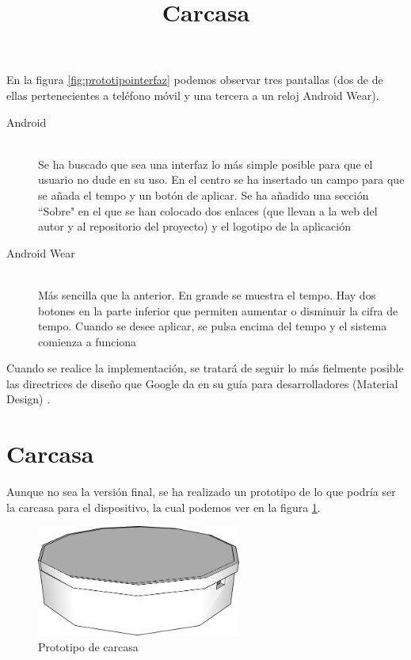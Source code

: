 En la figura \ref{fig:prototipointerfaz} podemos observar tres pantallas (dos de de ellas
pertenecientes a teléfono móvil y una tercera a un reloj Android Wear).

\begin{description}
  \item[Android] \hfill \\
    Se ha buscado que sea una interfaz lo más simple posible para que el usuario no dude
    en su uso. En el centro se ha insertado un campo para que se añada el tempo y un botón de aplicar.
    Se ha añadido una sección ``Sobre" en el que se han colocado dos enlaces (que
    llevan a la web del autor y al repositorio del proyecto) y el logotipo de la aplicación
  \item[Android Wear] \hfill \\
    Más sencilla que la anterior. En grande se muestra el tempo. Hay dos botones en la parte inferior que permiten
    aumentar o disminuir la cifra de tempo. Cuando se desee aplicar, se pulsa encima del tempo y el sistema
    comienza a funciona
\end{description}

Cuando se realice la implementación, se tratará de seguir lo más fielmente posible las directrices de diseño que
Google da en su guía para desarrolladores (Material Design) \cite{googlematerial}.\\

\section{Carcasa}
\title{Carcasa}
Aunque no sea la versión final, se ha realizado un prototipo de lo que podría ser la carcasa para el dispositivo, la
cual podemos ver en la figura \ref{fig:prototipocase}. \\

\begin{figure}[htb]
\centering
\includegraphics[width=0.6\textwidth]{./imagenes/prototipo}
\caption{Prototipo de carcasa} \label{fig:prototipocase}
\end{figure}

